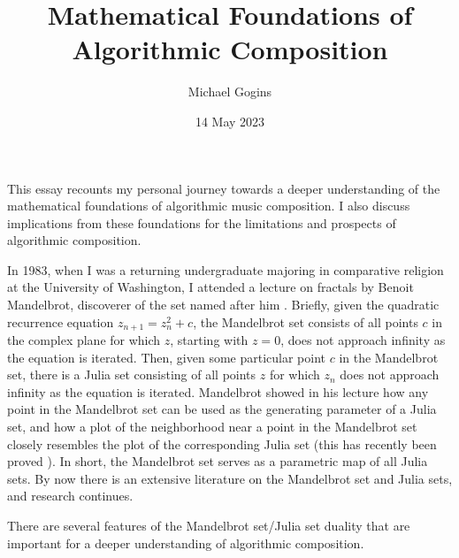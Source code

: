 \documentclass[11pt]{scrartcl}
\title{Mathematical Foundations of Algorithmic Composition}
\author{Michael Gogins}
\date{14 May 2023}                                           %
\begin{document}
\maketitle
This essay recounts my personal journey towards a deeper understanding of the mathematical foundations of algorithmic music composition. I also discuss  implications from these foundations for the limitations and prospects of algorithmic composition.

In 1983, when I was a returning undergraduate majoring in comparative religion at the University of Washington, I attended a lecture on fractals by Benoit Mandelbrot, discoverer of the set named after him \cite{citeulike:580392, peitgen2004mandelbrot}. Briefly, given the quadratic recurrence equation $z_{n+1} = z_n^2 + c$, the Mandelbrot set consists of all points $c$ in the complex plane for which $z$, starting with $z = 0$, does not approach infinity as the equation is iterated. Then, given some particular point $c$ in the Mandelbrot set, there is a Julia set consisting of all points $z$ for which $z_n$ does not approach infinity as the equation is iterated.  Mandelbrot showed in his lecture how any point in the Mandelbrot set can be used as the generating parameter of a Julia set, and how a plot of the neighborhood near a point in the Mandelbrot set closely resembles the plot of the corresponding Julia set \cite{lei1990similarity} (this has recently been proved \cite{kawahira2018julia}). In short, the Mandelbrot set serves as a parametric map of all Julia sets. By now there is an extensive literature on the Mandelbrot set and Julia sets, and research continues. 

There are several features of the Mandelbrot set/Julia set duality that are important for a deeper understanding of algorithmic composition.
\end{document}
